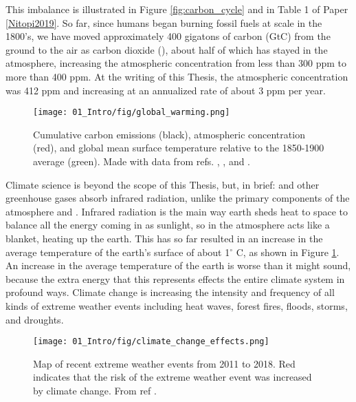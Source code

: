 This imbalance is illustrated in Figure \ref{fig:carbon_cycle} and in Table 1 of Paper \ref{Nitopi2019}. So far, since humans began burning fossil fuels at scale in the 1800's, we have moved approximately 400 gigatons of carbon (GtC) from the ground to the air as carbon dioxide (), about half of which has stayed in the atmosphere, increasing the atmospheric  concentration from less than 300 ppm to more than 400 ppm\cite{IPCC2014, LeQuere2018}. At the writing of this Thesis, the atmospheric  concentration was 412 ppm and increasing at an annualized rate of about 3 ppm per year\cite{NOAA2019}. 

\begin{figure}[h!]
	\centering
	\texttt{[image: 01\_Intro/fig/global\_warming.png]}
	\caption{Cumulative carbon emissions (black), atmospheric  concentration (red), and global mean surface temperature relative to the 1850-1900 average (green). Made with data from refs. , , and .}
	\label{fig:temperatures}
\end{figure}

Climate science is beyond the scope of this Thesis, but, in brief:  and other greenhouse gases absorb infrared radiation, unlike the primary components of the atmosphere  and . Infrared radiation is the main way earth sheds heat to space to balance all the energy coming in as sunlight, so  in the atmosphere acts like a blanket, heating up the earth. This has so far resulted in an increase in the average temperature of the earth's surface of about 1$^\circ$ C, as shown in Figure \ref{fig:temperatures}. An increase in the average temperature of the earth is worse than it might sound, because the extra energy that this represents effects the entire climate system in profound ways. Climate change is increasing the intensity and frequency of all kinds of extreme weather events including heat waves, forest fires, floods, storms, and droughts\cite{IPCC2014, CarbonBrief}. 
\begin{figure}[h!]
	\centering
	\texttt{[image: 01\_Intro/fig/climate\_change\_effects.png]}
	\caption{Map of recent extreme weather events from 2011 to 2018. Red indicates that the risk of the extreme weather event was increased by climate change. From %
	ref .
}
	\label{fig:attribution}
\end{figure}

